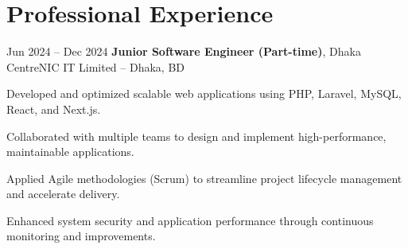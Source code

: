 \section{Professional Experience}

\begin{twocolentry}{
    Jun 2024 – Dec 2024
}
    \textbf{Junior Software Engineer (Part-time)}, Dhaka CentreNIC IT Limited -- Dhaka, BD
\end{twocolentry}

\vspace{0.10 cm}
\begin{onecolentry}
    \begin{highlights}
        \item Developed and optimized scalable web applications using PHP, Laravel, MySQL, React, and Next.js.
        \item Collaborated with multiple teams to design and implement high-performance, maintainable applications.
        \item Applied Agile methodologies (Scrum) to streamline project lifecycle management and accelerate delivery.
        \item Enhanced system security and application performance through continuous monitoring and improvements.
    \end{highlights}
\end{onecolentry}




